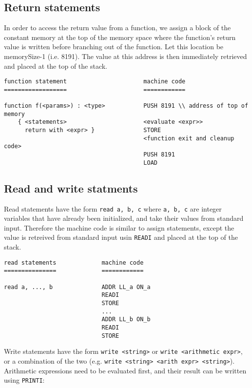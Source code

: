 \documentclass[11pt]{article}
\begin{document}
\subsection{Return statements}

In order to access the return value from a function, we assign a block of the constant memory at the top of the memory space where the function's return value is written before branching out of the function. Let this location be memorySize-1 (i.e. 8191). The value at this address is then immediately retrieved and placed at the top of the stack.

\begin{verbatim}
function statement                      machine code
==================                      ============

function f(<params>) : <type>           PUSH 8191 \\ address of top of memory         
    { <statements>                      <evaluate <expr>>
      return with <expr> }              STORE
                                        <function exit and cleanup code>
                                        PUSH 8191
                                        LOAD
\end{verbatim}

\subsection{Read and write statments}

Read statements have the form \texttt{read a, b, c} where \texttt{a, b, c} are integer variables that have already been initialized, and take their values from standard input. Therefore the machine code is similar to assign statements, except the value is retreived from standard input usin \texttt{READI} and placed at the top of the stack.

\begin{verbatim}
read statements             machine code
===============             ============

read a, ..., b              ADDR LL_a ON_a
                            READI
                            STORE
                            ...
                            ADDR LL_b ON_b
                            READI
                            STORE
\end{verbatim}

Write statements have the form \texttt{write <string>} or \texttt{write <arithmetic expr>}, or a combination of the two (e.g. \texttt{write <string> <arith expr> <string>}). Arithmetic expressions need to be evaluated first, and their result can be written using \texttt{PRINTI}:
\end{document}
